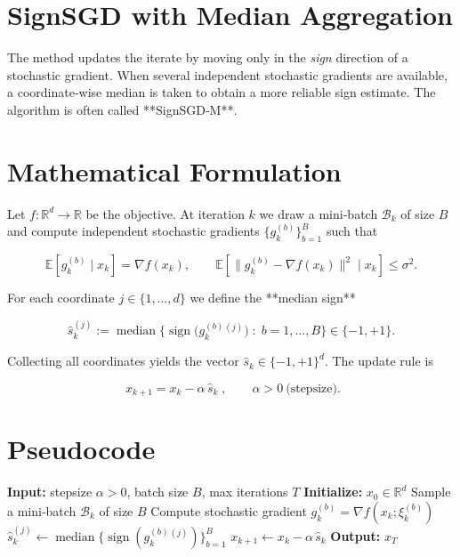 \documentclass{article}
\newcommand{\sign}{\operatorname{sign}}
\newcommand{\EE}{\mathbb{E}}
\newcommand{\RR}{\mathbb{R}}
\newcommand{\grad}{\nabla}
\begin{document}
\section*{SignSGD with Median Aggregation}

The method updates the iterate by moving only in the \emph{sign} direction of a stochastic gradient.
When several independent stochastic gradients are available, a coordinate‑wise median is taken
to obtain a more reliable sign estimate.  The algorithm is often called **SignSGD‑M**.

\section*{Mathematical Formulation}

Let $f:\RR^{d}\rightarrow\RR$ be the objective.  
At iteration $k$ we draw a mini‑batch $\mathcal{B}_{k}$ of size $B$ and compute independent stochastic gradients
$\{g_{k}^{(b)}\}_{b=1}^{B}$ such that  

\[
\EE\!\left[g_{k}^{(b)}\mid x_{k}\right]=\grad f(x_{k}),\qquad 
\EE\!\left[\|g_{k}^{(b)}-\grad f(x_{k})\|^{2}\mid x_{k}\right]\le\sigma^{2}.
\]

For each coordinate $j\in\{1,\dots ,d\}$ we define the **median sign**

\[
\hat{s}_{k}^{(j)}:=\operatorname{median}\Big\{\sign\!\big(g_{k}^{(b)}{}^{(j)}\big)\;:\;b=1,\dots ,B\Big\}\in\{-1,+1\}.
\]

Collecting all coordinates yields the vector $\hat{s}_{k}\in\{-1,+1\}^{d}$.
The update rule is

\[
\boxed{\;x_{k+1}=x_{k}-\alpha\,\hat{s}_{k}\;},\qquad \alpha>0\ \text{(stepsize)}.
\]

\section*{Pseudocode}
\begin{algorithm}[H]
\caption{SignSGD with Median Aggregation}
\begin{algorithmic}[1]
\STATE \textbf{Input:} stepsize $\alpha>0$, batch size $B$, max iterations $T$  
\STATE \textbf{Initialize:} $x_{0}\in\RR^{d}$  
    \STATE Sample a mini‑batch $\mathcal{B}_{k}$ of size $B$  
        \STATE Compute stochastic gradient $g_{k}^{(b)}=\grad f(x_{k};\xi_{k}^{(b)})$  
    \ENDFOR
        \STATE $\hat{s}_{k}^{(j)}\gets\operatorname{median}\big\{\sign(g_{k}^{(b)}{}^{(j)})\big\}_{b=1}^{B}$  
    \ENDFOR
    \STATE $x_{k+1}\gets x_{k}-\alpha\,\hat{s}_{k}$  
\ENDFOR
\STATE \textbf{Output:} $x_{T}$
\end{algorithmic}
\end{algorithm}
\end{document}
